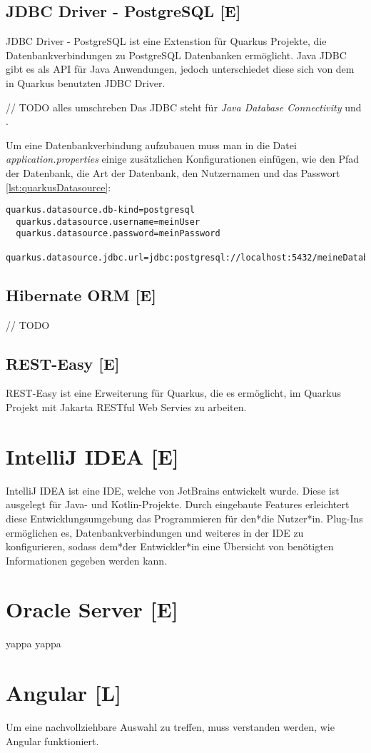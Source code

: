\subsection{JDBC Driver - PostgreSQL [E]}
JDBC Driver - PostgreSQL ist eine Extenstion für Quarkus Projekte, die Datenbankverbindungen zu PostgreSQL Datenbanken ermöglicht.
Java JDBC gibt es als API für Java Anwendungen, jedoch unterschiedet diese sich von dem in Quarkus benutzten JDBC Driver.

// TODO alles umschreben
Das JDBC steht für \emph{Java Database Connectivity} und .

Um eine Datenbankverbindung aufzubauen muss man in die Datei \emph{application.properties} einige zusätzlichen Konfigurationen einfügen, wie den Pfad der Datenbank, die Art der Datenbank, den Nutzernamen und das Passwort \ref{lst:quarkusDatasource}:

\begin{lstlisting}[caption=Beispielkonfigurationen,label=lst:quarkusDatasource]
  quarkus.datasource.db-kind=postgresql 
  quarkus.datasource.username=meinUser
  quarkus.datasource.password=meinPassword
  quarkus.datasource.jdbc.url=jdbc:postgresql://localhost:5432/meineDatabase
\end{lstlisting}

\subsection{Hibernate ORM [E]}
// TODO

\subsection{REST-Easy [E]}
REST-Easy ist eine Erweiterung für Quarkus, die es ermöglicht, im Quarkus Projekt mit Jakarta RESTful Web Servies zu arbeiten. 


\section{IntelliJ IDEA [E]}
IntelliJ IDEA ist eine IDE, welche von JetBrains entwickelt wurde. Diese ist ausgelegt für Java- und Kotlin-Projekte. 
Durch eingebaute Features erleichtert diese Entwicklungsumgebung das Programmieren für den*die Nutzer*in. 
Plug-Ins ermöglichen es, Datenbankverbindungen und weiteres in der IDE zu konfigurieren, sodass dem*der Entwickler*in eine Übersicht von benötigten Informationen gegeben werden kann.
\cite{IntelliJIDEA}

\section{Oracle Server [E]}
yappa yappa

\section{Angular [L]}
Um eine nachvollziehbare Auswahl zu treffen, muss verstanden werden, wie Angular funktioniert. 

